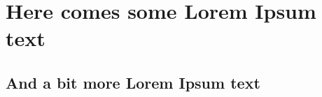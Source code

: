 \documentclass{scrartcl}
\begin{document}
\section{Here comes some Lorem Ipsum text}
\Blindtext[2][3]

\subsection{And a bit more Lorem Ipsum text}
\Blindtext[5]
\end{document}

